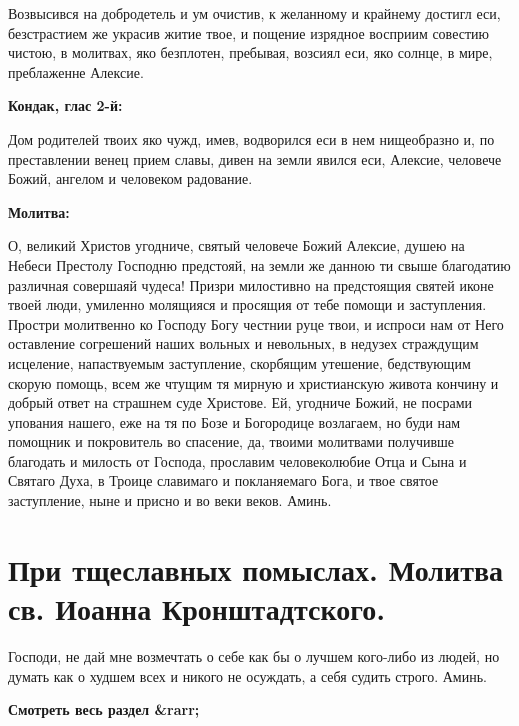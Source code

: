 Возвысився на добродетель и ум очистив, к желанному и крайнему достигл еси, безстрастием же украсив житие твое, и пощение изрядное восприим совестию чистою, в молитвах, яко безплотен, пребывая, возсиял еси, яко солнце, в мире, преблаженне Алексие.


\medskip


\bfseries Кондак, глас 2-й:\normalfont{}


Дом родителей твоих яко чужд, имев, водворился еси в нем нищеобразно и, по преставлении венец прием славы, дивен на земли явился еси, Алексие, человече Божий, ангелом и человеком радование.


\medskip


\bfseries Молитва:\normalfont{}


О, великий Христов угодниче, святый человече Божий Алексие, душею на Небеси Престолу Господню предстояй, на земли же данною ти свыше благодатию различная совершаяй чудеса! Призри милостивно на предстоящия святей иконе твоей люди, умиленно молящияся и просящия от тебе помощи и заступления. Простри молитвенно ко Господу Богу честнии руце твои, и испроси нам от Него оставление согрешений наших вольных и невольных, в недузех страждущим исцеление, напаствуемым заступление, скорбящим утешение, бедствующим скорую помощь, всем же чтущим тя мирную и христианскую живота кончину и добрый ответ на страшнем суде Христове. Ей, угодниче Божий, не посрами упования нашего, еже на тя по Бозе и Богородице возлагаем, но буди нам помощник и покровитель во спасение, да, твоими молитвами получивше благодать и милость от Господа, прославим человеколюбие Отца и Сына и Святаго Духа, в Троице славимаго и покланяемаго Бога, и твое святое заступление, ныне и присно и во веки веков. Аминь.


\section{При тщеславных помыслах. Молитва св. Иоанна Кронштадтского.}
 


Господи, не дай мне возмечтать о себе как бы о лучшем кого-либо из людей, но думать как о худшем всех и никого не осуждать, а себя судить строго. Аминь.


\mychapterending


\bfseries Смотреть весь раздел &rarr;\normalfont{} 

